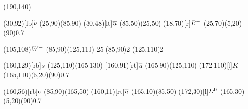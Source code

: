 \documentclass{standalone}
\begin{document}
\begin{axopicture}(190,140)

  \Text(30,92)[lb]{${b}$}       %
  \Line[arrow](25,90)(85,90)        %
  \Text(30,48)[lt]{${\overline {{u}}}$}    %
  \Line[arrow](85,50)(25,50)        %
  \Text(18,70)[r]{${{{B}^-}}$}            %
  \GOval(25,70)(5,20)(90){0.7}      %
                                    
  \Text(105,108){\small{${W^-}$}}     %
  \Photon(85,90)(125,110){-2}{5}    %
  \Vertex(85,90){2}                 %
  \Vertex(125,110){2}               %
                                    
  \Text(160,129)[rb]{${s}$}     %
  \Line[arrow](125,110)(165,130)    %
  \Text(160,91)[rt]{${\overline {{u}}}$}   %
  \Line[arrow](165,90)(125,110)     %
  \Text(172,110)[l]{${{K}^-}$}          %
  \GOval(165,110)(5,20)(90){0.7}    %
                                    
  \Text(160,56)[rb]{${c}$}      %
  \Line[arrow](85,90)(165,50)       %
  \Text(160,11)[rt]{${\overline {{u}}}$}   %
  \Line[arrow](165,10)(85,50)       %
  \Text(172,30)[l]{${{D}^0}$}           %
  \GOval(165,30)(5,20)(90){0.7}     %
                                    
\end{axopicture}
\end{document}
